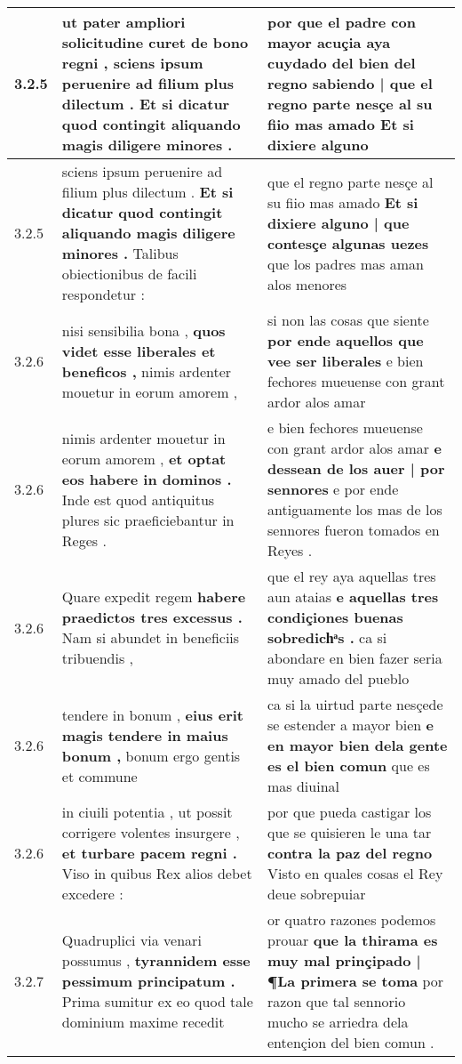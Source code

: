 \begin{tabular}{|p{1cm}|p{6.5cm}|p{6.5cm}|}
3.2.5 & ut pater ampliori solicitudine curet de bono regni , \textbf{ sciens ipsum peruenire ad filium plus dilectum . } Et si dicatur quod contingit aliquando magis diligere minores . & por que el padre con mayor acuçia aya cuydado del bien del regno \textbf{ sabiendo | que el regno parte nesçe al su fiio mas amado } Et si dixiere alguno \\\hline
3.2.5 & sciens ipsum peruenire ad filium plus dilectum . \textbf{ Et si dicatur quod contingit aliquando magis diligere minores . } Talibus obiectionibus de facili respondetur : & que el regno parte nesçe al su fiio mas amado \textbf{ Et si dixiere alguno | que contesçe algunas uezes } que los padres mas aman alos menores \\\hline
3.2.6 & nisi sensibilia bona , \textbf{ quos videt esse liberales et beneficos , } nimis ardenter mouetur in eorum amorem , & si non las cosas que siente \textbf{ por ende aquellos que vee ser liberales } e bien fechores mueuense con grant ardor alos amar \\\hline
3.2.6 & nimis ardenter mouetur in eorum amorem , \textbf{ et optat eos habere in dominos . } Inde est quod antiquitus plures sic praeficiebantur in Reges . & e bien fechores mueuense con grant ardor alos amar \textbf{ e dessean de los auer | por sennores } e por ende antiguamente los mas de los sennores fueron tomados en Reyes . \\\hline
3.2.6 & Quare expedit regem \textbf{ habere praedictos tres excessus . } Nam si abundet in beneficiis tribuendis , & que el rey aya aquellas tres aun ataias \textbf{ e aquellas tres condiçiones buenas sobredichͣs . } ca si abondare en bien fazer seria muy amado del pueblo \\\hline
3.2.6 & tendere in bonum , \textbf{ eius erit magis tendere in maius bonum , } bonum ergo gentis et commune & ca si la uirtud parte nesçede se estender a mayor bien \textbf{ e en mayor bien dela gente es el bien comun } que es mas diuinal \\\hline
3.2.6 & in ciuili potentia , ut possit corrigere volentes insurgere , \textbf{ et turbare pacem regni . } Viso in quibus Rex alios debet excedere : & por que pueda castigar los que se quisieren le una tar \textbf{ contra la paz del regno } Visto en quales cosas el Rey deue sobrepuiar \\\hline
3.2.7 & Quadruplici via venari possumus , \textbf{ tyrannidem esse pessimum principatum . } Prima sumitur ex eo quod tale dominium maxime recedit & or quatro razones podemos prouar \textbf{ que la thirama es muy mal prinçipado | ¶La primera se toma } por razon que tal sennorio mucho se arriedra dela entençion del bien comun . \\\hline

\end{tabular}

